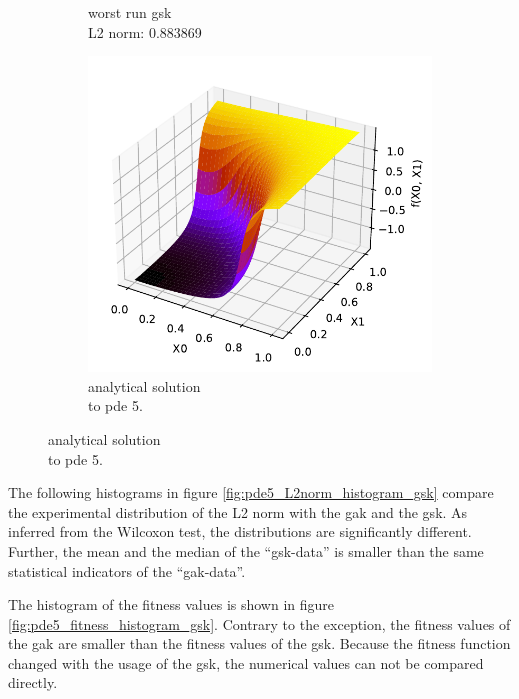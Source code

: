 \documentclass[./\jobname.tex]{subfiles}
\begin{document}
\begin{figure}[H]
\begin{subfigure}[b]{0.3333\linewidth}
		\caption{worst run \gls{gsk} \\L2 norm: 0.883869}
		\label{fig:pde5_ex3_best_solution_adaptive}
	\end{subfigure}%
	\begin{subfigure}[b]{0.3333\linewidth}
		\centering
		\includegraphics[width=1\textwidth]{../../code/testbed/pde5/sol_pde_5.pdf}
		\caption{analytical solution \\to \gls{pde} 5.}
		\label{fig:pde5_analytical_solution_3}
	\end{subfigure}%
	\label{fig:pde5_ex3_compare_best_worst}
\end{figure}

The following histograms in figure \ref{fig:pde5_L2norm_histogram_gsk} compare the experimental distribution of the L2 norm with the \gls{gak} and the \gls{gsk}. As inferred from the Wilcoxon test, the distributions are significantly different. Further, the mean and the median of the ``\gls{gsk}-data'' is smaller than the same statistical indicators of the ``\gls{gak}-data''. 

The histogram of the fitness values is shown in figure \ref{fig:pde5_fitness_histogram_gsk}. Contrary to the exception, the fitness values of the \gls{gak} are smaller than the fitness values of the \gls{gsk}. Because the fitness function changed with the usage of the \gls{gsk}, the numerical values can not be compared directly. 
\end{document}

